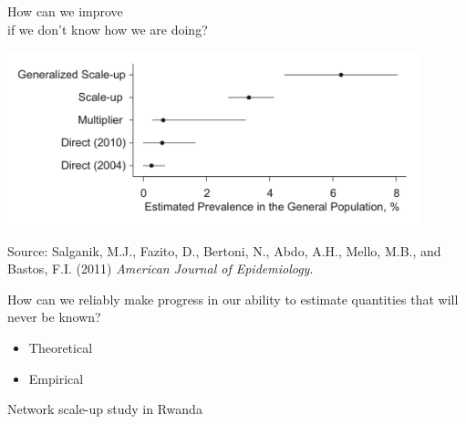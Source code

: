 \documentclass[aspectratio=169]{beamer}
\begin{document}
\begin{frame}

\Large{
\begin{center}
How can we improve\\if we don't know how we are doing?
\end{center}
}

\end{frame}
\begin{frame}

\begin{center}
\includegraphics[width=0.9\textwidth]{figures/salganik_assessing_2011_fig2}
\end{center}
\small{
Source: Salganik, M.J., Fazito, D., Bertoni, N., Abdo, A.H., Mello, M.B., and Bastos, F.I. (2011)  \textit{American Journal of Epidemiology}. }

\end{frame}
\begin{frame}

\begin{center}
How can we reliably make progress in our ability to estimate quantities that will never be known?
\end{center}
\pause
\begin{itemize}
\item Theoretical 
\item Empirical 
\end{itemize}


\end{frame}
\begin{frame}

\LARGE{Network scale-up study in Rwanda}

\end{frame}
\end{document}
